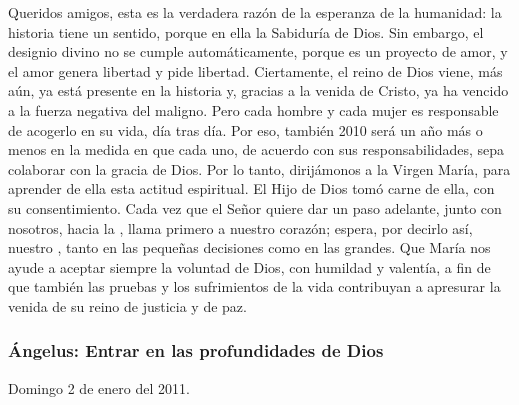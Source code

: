 \begin{body}
\begin{body}
Queridos amigos, esta es la verdadera razón de la esperanza de la humanidad: la historia tiene un sentido, porque en ella  la Sabiduría de Dios. Sin embargo, el designio divino no se cumple automáticamente, porque es un proyecto de amor, y el amor genera libertad y pide libertad. Ciertamente, el reino de Dios viene, más aún, ya está presente en la historia y, gracias a la venida de Cristo, ya ha vencido a la fuerza negativa del maligno. Pero cada hombre y cada mujer es responsable de acogerlo en su vida, día tras día. Por eso, también 2010 será un año más o menos  en la medida en que cada uno, de acuerdo con sus responsabilidades, sepa colaborar con la gracia de Dios. Por lo tanto, dirijámonos a la Virgen María, para aprender de ella esta actitud espiritual. El Hijo de Dios tomó carne de ella, con su consentimiento. Cada vez que el Señor quiere dar un paso adelante, junto con nosotros, hacia la , llama primero a nuestro corazón; espera, por decirlo así, nuestro , tanto en las pequeñas decisiones como en las grandes. Que María nos ayude a aceptar siempre la voluntad de Dios, con humildad y valentía, a fin de que también las pruebas y los sufrimientos de la vida contribuyan a apresurar la venida de su reino de justicia y de paz.

\subsubsection{Ángelus: Entrar en las profundidades de Dios}

Domingo 2 de enero del 2011.


\end{body}
\end{body}
